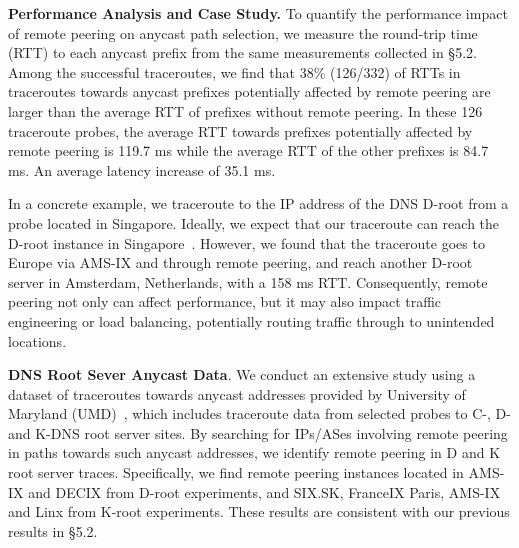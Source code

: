 \vspace{3pt}
\textbf{Performance Analysis and Case Study.}
To quantify the performance impact of remote peering on anycast path selection, 
we measure the round-trip time (RTT) to each
anycast prefix from the same measurements collected in \S5.2. Among the
successful traceroutes, we find that 38\% (126/332) of RTTs in traceroutes
towards anycast prefixes potentially affected by remote peering are larger than
the average RTT of prefixes without remote peering.
In these 126 traceroute probes, the average RTT towards prefixes potentially affected by remote peering is 119.7 ms while the average RTT of the other prefixes is 84.7 ms. An average latency increase of 35.1 ms. 

In a concrete example, we traceroute to the IP address of the DNS D-root from a probe located in Singapore.
Ideally, we expect that our traceroute can reach the D-root instance in Singapore~\cite{RootDNS}.
However, we found that the traceroute goes to Europe via AMS-IX and through
remote peering, and reach another D-root server in Amsterdam, Netherlands, with a 158 ms RTT. Consequently, remote peering not only can affect performance, but it may also impact traffic engineering or load balancing, potentially routing traffic through to unintended locations.



\vspace{3pt}
\textbf{DNS Root Sever Anycast Data}. 
We conduct an extensive study using a dataset of traceroutes towards anycast addresses provided by University of Maryland (UMD)~\cite{UMD_anycast}, which includes  traceroute data from selected probes to C-, D- and K-DNS root server sites. By searching for IPs/ASes involving remote peering in  paths towards such anycast addresses, we identify remote peering in D and K root server traces. Specifically, we find remote peering instances located in AMS-IX and DECIX from D-root experiments, and SIX.SK, FranceIX Paris, AMS-IX and Linx from K-root experiments.
These results are consistent with our previous results in \S5.2. 

